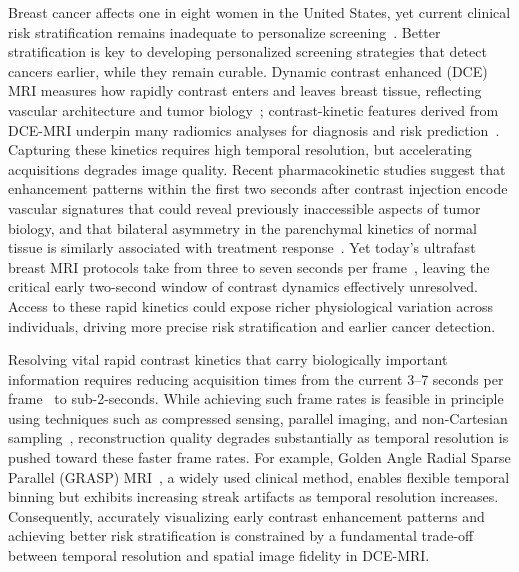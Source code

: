 \documentclass[runningheads]{llncs}
\begin{document}
Breast cancer affects one in eight women in the United States, yet current clinical risk stratification remains inadequate to personalize screening~\cite{Puckett2025Disparity,Niell2021LifetimeRisk}. Better stratification is key to developing personalized screening strategies that detect cancers earlier, while they remain curable. Dynamic contrast enhanced (DCE) MRI measures how rapidly contrast enters and leaves breast tissue, reflecting vascular architecture and tumor biology~\cite{Sachani2024VascularityReview}; contrast-kinetic features derived from DCE-MRI underpin many radiomics analyses for diagnosis and risk prediction~\cite{Turnbull2009Dynamic,Kim2025OncotypeRadiomics,Cheng2025KineticHeterogeneity}. Capturing these kinetics requires high temporal resolution, but accelerating acquisitions degrades image quality. Recent pharmacokinetic studies suggest that enhancement patterns within the first two seconds after contrast injection encode vascular signatures that could reveal previously inaccessible aspects of tumor biology, and that bilateral asymmetry in the parenchymal kinetics of normal tissue is similarly associated with treatment response~\cite{REN20239}. Yet today’s ultrafast breast MRI protocols take from three to seven seconds per frame~\cite{Kataoka2024Ultrafast}, leaving the critical early two-second window of contrast dynamics effectively unresolved. Access to these rapid kinetics could expose richer physiological variation across individuals, driving more precise risk stratification and earlier cancer detection. 

Resolving vital rapid contrast kinetics that carry biologically important information requires reducing acquisition times from the current 3--7 seconds per frame~\cite{Kataoka2024Ultrafast} to sub-2-seconds. While achieving such frame rates is feasible in principle using techniques such as compressed sensing, parallel imaging, and non-Cartesian sampling~\cite{Deshmane2012Parallel,Ye2019Compressed}, reconstruction quality degrades substantially as temporal resolution is pushed toward these faster frame rates. For example, Golden Angle Radial Sparse Parallel (GRASP) MRI~\cite{Feng2014Golden}, a widely used clinical method, enables flexible temporal binning but exhibits increasing streak artifacts as temporal resolution increases. Consequently, accurately visualizing early contrast enhancement patterns and achieving better risk stratification is constrained by a fundamental trade-off between temporal resolution and spatial image fidelity in DCE-MRI.
\end{document}
